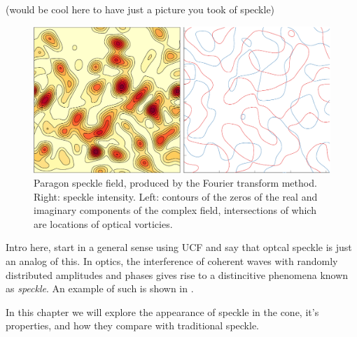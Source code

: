 (would be cool here to have just a picture you took of speckle)
\begin{figure}[ht]
\centering
\includegraphics[keepaspectratio,width=15cm]{speckle/figures/introfig.pdf}
\caption{Paragon speckle field, produced by the Fourier transform method.
								Right: speckle intensity.  Left: contours of the zeros of the real
								and imaginary components of the complex field, intersections of
								which are locations of optical vorticies.}
\label{fig:examplespeckle}
\end{figure}

Intro here, start in a general sense using UCF and say that optcal speckle
is just an analog of this.  \cite{lee1985universal}
In optics, the interference of coherent waves with randomly distributed
amplitudes and phases gives rise to a distincitive phenomena known as
\textit{speckle}.  An example of such is shown in
.  

In this chapter we will explore the appearance of speckle in the cone, it's
properties, and how they compare with traditional speckle.
